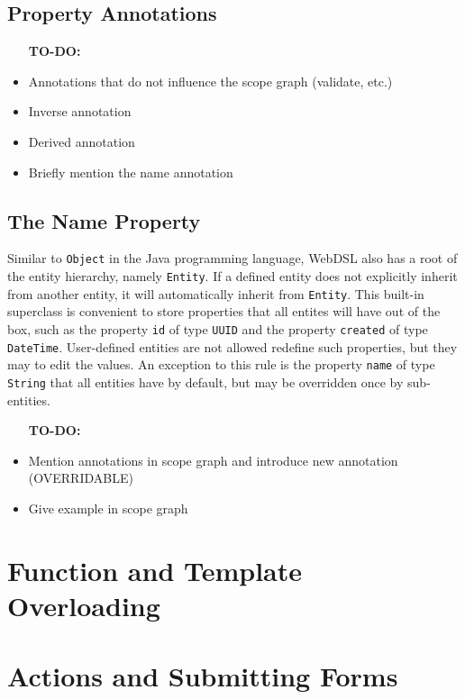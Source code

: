     \subsection{Property Annotations}

      \begin{itemize}
        \item [\textbf{TO-DO:}]
        \item Annotations that do not influence the scope graph (validate, etc.)
        \item Inverse annotation
        \item Derived annotation
        \item Briefly mention the name annotation
      \end{itemize}

    \subsection{The Name Property}

      Similar to \texttt{Object} in the Java programming language, WebDSL also has a root of the entity hierarchy, namely \texttt{Entity}. If a defined entity does not explicitly inherit from another entity, it will automatically inherit from \texttt{Entity}. This built-in superclass is convenient to store properties that all entites will have out of the box, such as the property \texttt{id} of type \texttt{UUID} and the property \texttt{created} of type \texttt{DateTime}. User-defined entities are not allowed redefine such properties, but they may to edit the values. An exception to this rule is the property \texttt{name} of type \texttt{String} that all entities have by default, but may be overridden once by sub-entities.

      \begin{itemize}
        \item [\textbf{TO-DO:}]
        \item Mention annotations in scope graph and introduce new annotation (OVERRIDABLE)
        \item Give example in scope graph
      \end{itemize}

  \section{\label{sec:function-template-overloading}Function and Template Overloading}

  \section{\label{sec:actions-and-submitting-forms}Actions and Submitting Forms}

